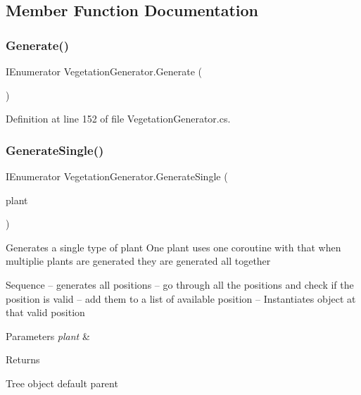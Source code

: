 \subsection{Member Function Documentation}
\mbox{\label{class_vegetation_generator_a1933cc928c652109412c426a9894648d}} 
\subsubsection{Generate()}
{\footnotesize\ttfamily I\+Enumerator Vegetation\+Generator.\+Generate (\begin{DoxyParamCaption}{ }\end{DoxyParamCaption})}



Definition at line 152 of file Vegetation\+Generator.\+cs.

\mbox{\label{class_vegetation_generator_a0de1e03a07dfa8a3f21f23d3366152f4}} 
\subsubsection{Generate\+Single()}
{\footnotesize\ttfamily I\+Enumerator Vegetation\+Generator.\+Generate\+Single (\begin{DoxyParamCaption}\item[{\textbf{ G\+D\+Plant}}]{plant }\end{DoxyParamCaption})}



Generates a single type of plant One plant uses one coroutine with that when multiplie plants are generated they are generated all together 

Sequence -- generates all positions -- go through all the positions and check if the position is valid -- add them to a list of available position -- Instantiates object at that valid position 


\begin{DoxyParams}{Parameters}
{\em plant} & \\
\hline
\end{DoxyParams}
\begin{DoxyReturn}{Returns}

\end{DoxyReturn}
Tree object default parent 

